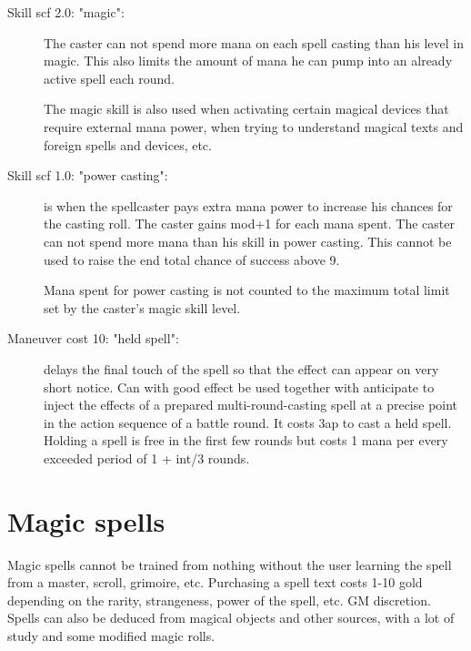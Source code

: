 \begin{description}


\item[Skill scf 2.0: "magic":] The caster can not spend more mana on each spell casting than his level in magic. This also limits the amount of mana he can pump into an already active spell each round.

The magic skill is also used when activating certain magical devices that require external mana power, when trying to understand magical texts and foreign spells and devices, etc.


\item[Skill scf 1.0: "power casting":] is when the spellcaster pays extra mana power to increase his chances for the casting roll. The caster gains mod+1 for each mana spent. The caster can not spend more mana than his skill in power casting. This cannot be used to raise the end total chance of success above 9.

Mana spent for power casting is not counted to the maximum total limit set by the caster's magic skill level.


\item[Maneuver cost 10: "held spell":] delays the final touch of the spell so that the effect can appear on very short notice. Can with good effect be used together with anticipate to inject the effects of a prepared multi-round-casting spell at a precise point in the action sequence of a battle round. It costs 3ap to cast a held spell. Holding a spell is free in the first few rounds but costs 1 mana per every exceeded period of 1 + int/3 rounds.


\end{description}







\section*{Magic spells}

Magic spells cannot be trained from nothing without the user learning the spell from a master, scroll, grimoire, etc. Purchasing a spell text costs 1-10 gold depending on the rarity, strangeness, power of the spell, etc. GM discretion.
Spells can also be deduced from magical objects and other sources, with a lot of study and some modified magic rolls.

